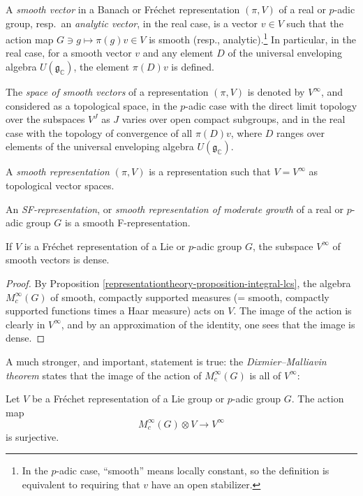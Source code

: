 \begin{definition}
 \label{definition-smooth-representation}
A {\it smooth vector} in a Banach or Fr\'echet representation $(\pi, V)$ of a real or $p$-adic group, resp.\ an {\it analytic vector}, in the real case, is a vector $v\in V$ such that the action map $G\ni g \mapsto \pi(g) v \in V$ is smooth (resp., analytic).\footnote{In the $p$-adic case, ``smooth'' means locally constant, so the definition is equivalent to requiring that $v$ have an open stabilizer.} In particular, in the real case, for a smooth vector $v$ and any element $D$ of the universal enveloping algebra $U(\mathfrak g_{\mathbb C})$, the element $\pi(D) v$ is defined.

The {\it space of smooth vectors} of a representation $(\pi, V)$ is denoted by $V^\infty$, and considered as a topological space, in the $p$-adic case with the direct limit topology over the subspaces $V^J$ as $J$ varies over open compact subgroups, and in the real case with the topology of convergence of all $\pi(D)v$, where $D$ ranges over elements of the universal enveloping algebra $U(\mathfrak g_{\mathbb C})$. 
 
A {\it smooth representation} $(\pi, V)$ is a representation such that $V = V^\infty$ as topological vector spaces. 

An {\it SF-representation}, or {\it smooth representation of moderate growth} of a real or $p$-adic group $G$ is a smooth F-representation. 
\end{definition}

\begin{lemma}
 \label{lemma-smooth-dense}
If $V$ is a Fr\'echet representation of a Lie or $p$-adic group $G$, the subspace $V^\infty$ of smooth vectors is dense.
\end{lemma}

\begin{proof}
 By Proposition \ref{representationtheory-proposition-integral-lcs}, the algebra $M_c^\infty(G)$ of smooth, compactly supported measures (= smooth, compactly supported functions times a Haar measure) acts on $V$. The image of the action is clearly in $V^\infty$, and by an approximation of the identity, one sees that the image is dense. 
\end{proof}

A much stronger, and important, statement is true: the {\it Dixmier--Malliavin theorem} states that the image of the action of $M_c^\infty(G)$ is all of $V^\infty$:

\begin{theorem}
 \label{theorem-Dixmier-Malliavin}
Let $V$ be a Fr\'echet representation of a Lie group or $p$-adic group $G$. The action map 
$$ M_c^\infty(G)\otimes V \to V^\infty$$
is surjective.
\end{theorem}

